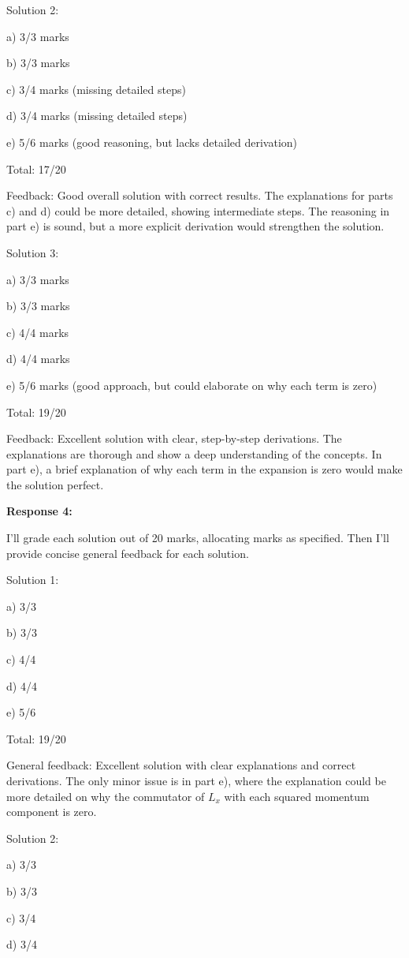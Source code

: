 \documentclass[a4paper,11pt]{article}
\begin{document}
Solution 2:

a) 3/3 marks

b) 3/3 marks

c) 3/4 marks (missing detailed steps)

d) 3/4 marks (missing detailed steps)

e) 5/6 marks (good reasoning, but lacks detailed derivation)

Total: 17/20

Feedback: Good overall solution with correct results. The explanations for parts c) and d) could be more detailed, showing intermediate steps. The reasoning in part e) is sound, but a more explicit derivation would strengthen the solution.

Solution 3:

a) 3/3 marks

b) 3/3 marks

c) 4/4 marks

d) 4/4 marks

e) 5/6 marks (good approach, but could elaborate on why each term is zero)

Total: 19/20

Feedback: Excellent solution with clear, step-by-step derivations. The explanations are thorough and show a deep understanding of the concepts. In part e), a brief explanation of why each term in the expansion is zero would make the solution perfect.

\bigskip   
\textbf{Response 4:}

I'll grade each solution out of 20 marks, allocating marks as specified. Then I'll provide concise general feedback for each solution.

Solution 1:

a) 3/3

b) 3/3

c) 4/4

d) 4/4

e) 5/6

Total: 19/20

General feedback: Excellent solution with clear explanations and correct derivations. The only minor issue is in part e), where the explanation could be more detailed on why the commutator of \(L_x\) with each squared momentum component is zero.

Solution 2:

a) 3/3

b) 3/3

c) 3/4

d) 3/4
\end{document}
